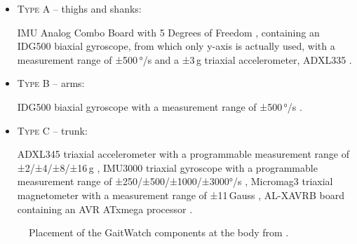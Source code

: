 \begin{itemize}

\item \textsc{Type A} -- thighs and shanks: 

IMU Analog Combo Board with 5 Degrees of Freedom \cite{IMU5}, containing an IDG500 biaxial gyroscope, from which only y-axis is actually used, with a measurement range of ±500\,°/s \cite{IDG500} and a ±3\,g triaxial accelerometer, ADXL335 \cite{ADXL335}.

\item \textsc{Type B} -- arms:

IDG500 biaxial gyroscope with a measurement range of ±500\,°/s \cite{IDG500}.

\item \textsc{Type C} -- trunk:

ADXL345 triaxial accelerometer with a programmable measurement range of ±2/±4/±8/±16\,g \cite{ADXL345},
IMU3000 triaxial gyroscope with a programmable measurement range of ±250/±500/±1000/±3000°/s \cite{IMU3000}, 
Micromag3 \allowbreak triaxial magnetometer with a measurement range of ±11\,Gauss \cite{MicroMag3}, AL-XAVRB board containing an AVR ATxmega processor \cite{AVRATxmega}.

\end{itemize}

\begin{figure}
	\centering
	\caption{Placement of the GaitWatch components at the body from \cite{olivares_vicente_gaitwatch_2013}.}
	\label{fig:GaitWatch_placement}
\end{figure}



